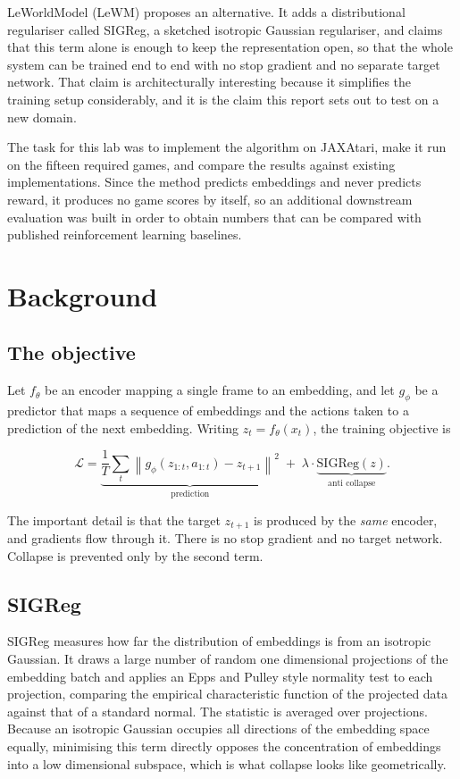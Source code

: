 \documentclass[11pt,a4paper]{article}
\begin{document}
LeWorldModel (LeWM) proposes an alternative. It adds a distributional regulariser
called SIGReg, a sketched isotropic Gaussian regulariser, and claims that this term
alone is enough to keep the representation open, so that the whole system can be
trained end to end with no stop gradient and no separate target network. That
claim is architecturally interesting because it simplifies the training setup
considerably, and it is the claim this report sets out to test on a new domain.

The task for this lab was to implement the algorithm on JAXAtari, make it run on
the fifteen required games, and compare the results against existing
implementations. Since the method predicts embeddings and never predicts reward,
it produces no game scores by itself, so an additional downstream evaluation was
built in order to obtain numbers that can be compared with published reinforcement
learning baselines.

\section{Background}

\subsection{The objective}

Let $f_\theta$ be an encoder mapping a single frame to an embedding, and let
$g_\phi$ be a predictor that maps a sequence of embeddings and the actions taken
to a prediction of the next embedding. Writing $z_t = f_\theta(x_t)$, the training
objective is

\begin{equation}
\mathcal{L} = \underbrace{\frac{1}{T}\sum_t \left\| g_\phi(z_{1:t}, a_{1:t}) - z_{t+1} \right\|^2}_{\text{prediction}}
\; + \; \lambda \cdot \underbrace{\mathrm{SIGReg}(z)}_{\text{anti collapse}} .
\end{equation}

The important detail is that the target $z_{t+1}$ is produced by the \emph{same}
encoder, and gradients flow through it. There is no stop gradient and no target
network. Collapse is prevented only by the second term.

\subsection{SIGReg}

SIGReg measures how far the distribution of embeddings is from an isotropic
Gaussian. It draws a large number of random one dimensional projections of the
embedding batch and applies an Epps and Pulley style normality test to each
projection, comparing the empirical characteristic function of the projected data
against that of a standard normal. The statistic is averaged over projections.
Because an isotropic Gaussian occupies all directions of the embedding space
equally, minimising this term directly opposes the concentration of embeddings
into a low dimensional subspace, which is what collapse looks like geometrically.
\end{document}
